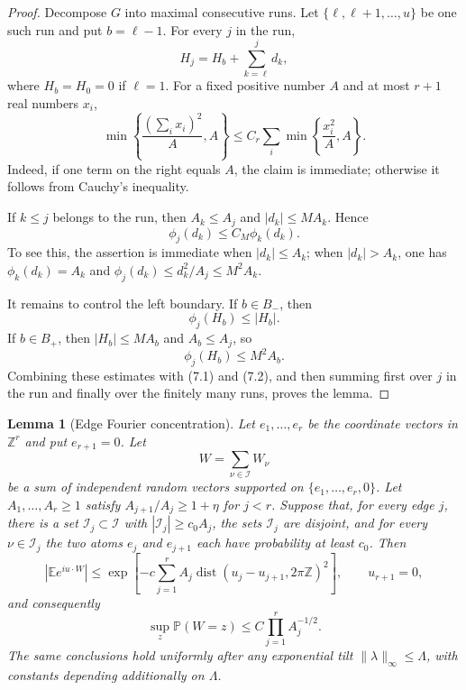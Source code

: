 \documentclass[11pt]{article}
\newtheorem{lemma}[theorem]{Lemma}
\theoremstyle{remark}
\newcommand{\Pp}{\mathbb P}
\newcommand{\Ee}{\mathbb E}
\begin{document}
\begin{proof}
Decompose \(G\) into maximal consecutive runs.  Let
\(\{\ell,\ell+1,\ldots,u\}\) be one such run and put
\(b=\ell-1\).  For every \(j\) in the run,
\[
        H_j=H_b+\sum_{k=\ell}^j d_k,
\]
where \(H_b=H_0=0\) if \(\ell=1\).  For a fixed positive number \(A\) and
at most \(r+1\) real numbers \(x_i\),
\[
        \min\left\{\frac{(\sum_i x_i)^2}{A},A\right\}
        \le C_r\sum_i
        \min\left\{\frac{x_i^2}{A},A\right\}.
        \tag{7.1}
\]
Indeed, if one term on the right equals \(A\), the claim is immediate; otherwise
it follows from Cauchy's inequality.

If \(k\le j\) belongs to the run, then \(A_k\le A_j\) and
\(|d_k|\le M A_k\).  Hence
\[
        \phi_j(d_k)\le C_M\phi_k(d_k).
        \tag{7.2}
\]
To see this, the assertion is immediate when \(|d_k|\le A_k\); when
\(|d_k|>A_k\), one has
\(\phi_k(d_k)=A_k\) and
\(\phi_j(d_k)\le d_k^2/A_j\le M^2A_k\).

It remains to control the left boundary.  If \(b\in B_-\), then
\[
        \phi_j(H_b)\le |H_b|.
\]
If \(b\in B_+\), then \(|H_b|\le M A_b\) and \(A_b\le A_j\), so
\[
        \phi_j(H_b)\le M^2 A_b.
\]
Combining these estimates with (7.1) and (7.2), and then summing first over
\(j\) in the run and finally over the finitely many runs, proves the lemma.
\end{proof}

\begin{lemma}[Edge Fourier concentration]\label{lem:edge-fourier}
Let $e_1,\ldots,e_r$ be the coordinate vectors in $\mathbb Z^r$ and put $e_{r+1}=0$.  Let
\[
        W=\sum_{\nu\in\mathcal I}W_\nu
\]
be a sum of independent random vectors supported on
$\{e_1,\ldots,e_r,0\}$.  Let $A_1,\ldots,A_r\ge1$ satisfy
$A_{j+1}/A_j\ge1+\eta$ for $j<r$.  Suppose that, for every edge $j$, there is a set
$\mathcal I_j\subset\mathcal I$ with $|\mathcal I_j|\ge c_0A_j$, the sets $\mathcal I_j$ are disjoint, and for every $\nu\in\mathcal I_j$ the two atoms $e_j$ and $e_{j+1}$ each have probability at least $c_0$.  Then
\[
        |\Ee e^{iu\cdot W}|
        \le \exp\left[-c\sum_{j=1}^r
        A_j\operatorname{dist}(u_j-u_{j+1},2\pi\mathbb Z)^2\right],
        \qquad u_{r+1}=0,
\]
and consequently
\[
        \sup_z\Pp(W=z)\le C\prod_{j=1}^r A_j^{-1/2}.
\]
The same conclusions hold uniformly after any exponential tilt
$\|\lambda\|_\infty\le\Lambda$, with constants depending additionally on
$\Lambda$.
\end{lemma}
\end{document}

